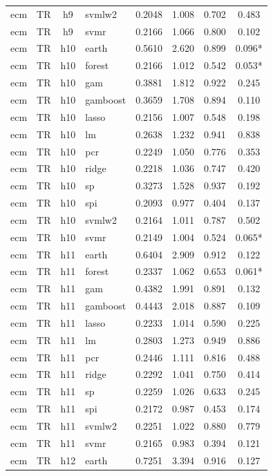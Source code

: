 \begin{ThreePartTable}
\begin{longtable}[t]{llclcccc}
ecm & TR & h9 & svmlw2 & 0.2048 & 1.008 & 0.702 & 0.483\\
ecm & TR & h9 & svmr & 0.2166 & 1.066 & 0.800 & 0.102\\
\addlinespace
ecm & TR & h10 & earth & 0.5610 & 2.620 & 0.899 & 0.096*\\
ecm & TR & h10 & forest & 0.2166 & 1.012 & 0.542 & 0.053*\\
ecm & TR & h10 & gam & 0.3881 & 1.812 & 0.922 & 0.245\\
ecm & TR & h10 & gamboost & 0.3659 & 1.708 & 0.894 & 0.110\\
ecm & TR & h10 & lasso & 0.2156 & 1.007 & 0.548 & 0.198\\
ecm & TR & h10 & lm & 0.2638 & 1.232 & 0.941 & 0.838\\
ecm & TR & h10 & pcr & 0.2249 & 1.050 & 0.776 & 0.353\\
ecm & TR & h10 & ridge & 0.2218 & 1.036 & 0.747 & 0.420\\
ecm & TR & h10 & sp & 0.3273 & 1.528 & 0.937 & 0.192\\
ecm & TR & h10 & spi & 0.2093 & 0.977 & 0.404 & 0.137\\
ecm & TR & h10 & svmlw2 & 0.2164 & 1.011 & 0.787 & 0.502\\
ecm & TR & h10 & svmr & 0.2149 & 1.004 & 0.524 & 0.065*\\
\addlinespace
ecm & TR & h11 & earth & 0.6404 & 2.909 & 0.912 & 0.122\\
ecm & TR & h11 & forest & 0.2337 & 1.062 & 0.653 & 0.061*\\
ecm & TR & h11 & gam & 0.4382 & 1.991 & 0.891 & 0.132\\
ecm & TR & h11 & gamboost & 0.4443 & 2.018 & 0.887 & 0.109\\
ecm & TR & h11 & lasso & 0.2233 & 1.014 & 0.590 & 0.225\\
ecm & TR & h11 & lm & 0.2803 & 1.273 & 0.949 & 0.886\\
ecm & TR & h11 & pcr & 0.2446 & 1.111 & 0.816 & 0.488\\
ecm & TR & h11 & ridge & 0.2292 & 1.041 & 0.750 & 0.414\\
ecm & TR & h11 & sp & 0.2259 & 1.026 & 0.633 & 0.245\\
ecm & TR & h11 & spi & 0.2172 & 0.987 & 0.453 & 0.174\\
ecm & TR & h11 & svmlw2 & 0.2251 & 1.022 & 0.880 & 0.779\\
ecm & TR & h11 & svmr & 0.2165 & 0.983 & 0.394 & 0.121\\
\addlinespace
ecm & TR & h12 & earth & 0.7251 & 3.394 & 0.916 & 0.127\\

\end{longtable}
\end{ThreePartTable}
